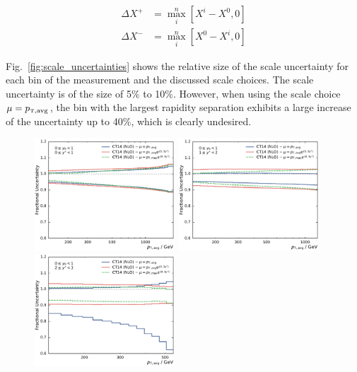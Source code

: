 \begin{align*}
    \Delta X^+ &= \max_{i}^{n} \left[ X^i - X^0, 0 \right]\\
    \Delta X^- &= \max_{i}^{n} \left[ X^0 - X^i, 0 \right]
\end{align*}


Fig.~\ref{fig:scale_uncertainties} shows the relative size of the scale
uncertainty for each bin of the measurement and the discussed scale choices. The
scale uncertainty is of the size of 5\% to 10\%. However, when using the scale
choice $\mu=\ptavg$, the bin with the largest rapidity separation exhibits a large
increase of the uncertainty up to 40\%, which is clearly undesired.

\begin{figure}[htp]
    \centering
    \includegraphics[width=0.47\textwidth]{figures/theory/scale_uncert_comp_yb0ys0.pdf}\hfill
    \includegraphics[width=0.47\textwidth]{figures/theory/scale_uncert_comp_yb0ys1.pdf}
    \includegraphics[width=0.47\textwidth]{figures/theory/scale_uncert_comp_yb0ys2.pdf}\hfill

\end{figure}

